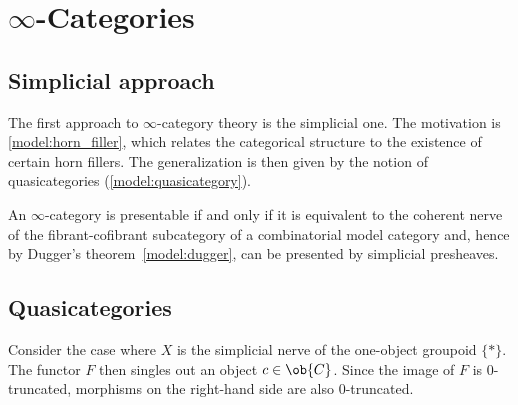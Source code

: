 \section{\texorpdfstring{$\infty$-Categories}{Infinity-categories}}\label{section:infinity_categories}
\subsection{Simplicial approach}

    The first approach to $\infty$-category theory is the simplicial one. The motivation is \cref{model:horn_filler}, which relates the categorical structure to the existence of certain horn fillers. The generalization is then given by the notion of quasicategories (\cref{model:quasicategory}).

    \begin{theorem}[Lurie]\label{model:lurie_presentation}
        An $\infty$-category is presentable if and only if it is equivalent to  the coherent nerve of the fibrant-cofibrant subcategory of a combinatorial model category and, hence by Dugger's theorem~\ref{model:dugger}, can be presented by simplicial presheaves.
     \end{theorem}

\subsection{Quasicategories}

    \begin{remark}
        Consider the case where $X$ is the simplicial nerve of the one-object groupoid $\{\ast\}$. The functor $F$ then singles out an object $c\in\ob{C}$. Since the image of $F$ is 0-truncated, morphisms on the right-hand side are also 0-truncated.
    \end{remark}


